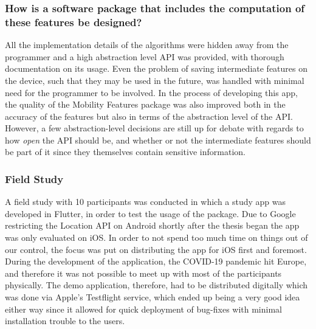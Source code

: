 \subsubsection*{How is a software package that includes the computation of these features be designed?}
All the implementation details of the algorithms were hidden away from the programmer and a high abstraction level API was provided, with thorough documentation on its usage. Even the problem of saving intermediate features on the device, such that they may be used in the future, was handled with minimal need for the programmer to be involved. In the process of developing this app, the quality of the Mobility Features package was also improved both in the accuracy of the features but also in terms of the abstraction level of the API. However, a few abstraction-level decisions are still up for debate with regards to how \textit{open} the API should be, and whether or not the intermediate features should be part of it since they themselves contain sensitive information.

\subsubsection*{Field Study}
A field study with 10 participants was conducted in which a study app was developed in Flutter, in order to test the usage of the package. Due to Google restricting the Location API on Android shortly after the thesis began the app was only evaluated on iOS. In order to not spend too much time on things out of our control, the focus was put on distributing the app for iOS first and foremost. During the development of the application, the COVID-19 pandemic hit Europe, and therefore it was not possible to meet up with most of the participants physically. The demo application, therefore, had to be distributed digitally which was done via Apple's Testflight service, which ended up being a very good idea either way since it allowed for quick deployment of bug-fixes with minimal installation trouble to the users.



